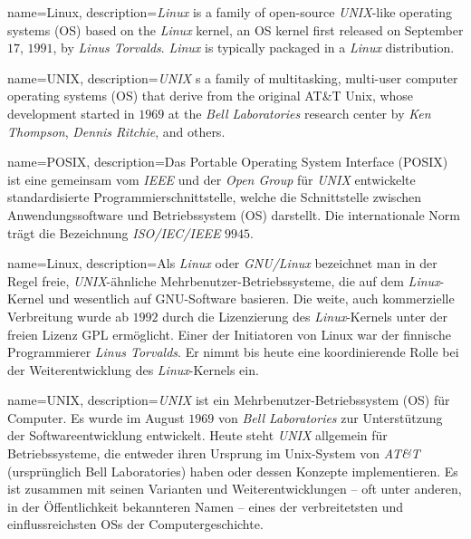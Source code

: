 	{%
		name={Linux},
		description={\textit{Linux} is a family of open-source \textit{UNIX}-like operating systems (OS) based on the \textit{Linux} kernel, an OS kernel first released on September $17$, $1991$, by \textit{Linus Torvalds}. \textit{Linux} is typically packaged in a \textit{Linux} distribution.}
	}

	{%
		name={UNIX},
		description={\textit{UNIX} s a family of multitasking, multi-user computer operating systems (OS) that derive from the original AT&T Unix, whose development started in $1969$ at the \textit{Bell Laboratories} research center by \textit{Ken Thompson}, \textit{Dennis Ritchie}, and others.}
	}

\else

	{%
		name={POSIX},
		description={Das Portable Operating System Interface (POSIX) ist eine gemeinsam vom \textit{IEEE} und der \textit{Open Group} für \textit{UNIX} entwickelte standardisierte Programmierschnittstelle, welche die Schnittstelle zwischen Anwendungssoftware und Betriebssystem (OS) darstellt. Die internationale Norm trägt die Bezeichnung \textit{ISO/IEC/IEEE} $9945$.}
	}

	{%
		name={Linux},
		description={Als \textit{Linux} oder \textit{GNU/Linux} bezeichnet man in der Regel freie, \textit{UNIX}-ähnliche Mehrbenutzer-Betriebssysteme, die auf dem \textit{Linux}-Kernel und wesentlich auf GNU-Software basieren. Die weite, auch kommerzielle Verbreitung wurde ab $1992$ durch die Lizenzierung des \textit{Linux}-Kernels unter der freien Lizenz GPL ermöglicht. Einer der Initiatoren von Linux war der finnische Programmierer \textit{Linus Torvalds}. Er nimmt bis heute eine koordinierende Rolle bei der Weiterentwicklung des \textit{Linux}-Kernels ein.}
	}

	{%
		name={UNIX},
		description={\textit{UNIX} ist ein Mehrbenutzer-Betriebssystem (OS) für Computer. Es wurde im August $1969$ von \textit{Bell Laboratories} zur Unterstützung der Softwareentwicklung entwickelt. Heute steht \textit{UNIX} allgemein für Betriebssysteme, die entweder ihren Ursprung im Unix-System von \textit{AT\&T} (ursprünglich Bell Laboratories) haben oder dessen Konzepte implementieren. Es ist zusammen mit seinen Varianten und Weiterentwicklungen – oft unter anderen, in der Öffentlichkeit bekannteren Namen – eines der verbreitetsten und einflussreichsten OSs der Computergeschichte.}
	}

\fi

